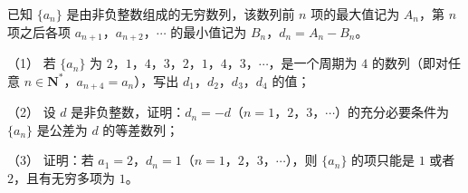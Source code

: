 \begin{question}
已知 $\{a_n\}$ 是由非负整数组成的无穷数列，该数列前 $n$ 项的最大值记为 $A_n$，第 $n$ 项之后各项 $a_{n+1}$，$a_{n+2}$，$\cdots$ 的最小值记为 $B_n$，$d_n=A_n-B_n$。

（1） 若 $\{a_n\}$ 为 $2$，$1$，$4$，$3$，$2$，$1$，$4$，$3$，$\cdots$，是一个周期为 $4$ 的数列（即对任意 $n\in\mathbf N^*$，$a_{n+4}=a_n$），写出 $d_1$，$d_2$，$d_3$，$d_4$ 的值；

（2） 设 $d$ 是非负整数，证明：$d_n=-d$（$n=1$，$2$，$3$，$\cdots$）的充分必要条件为 $\{a_n\}$ 是公差为 $d$ 的等差数列；

（3） 证明：若 $a_1=2$，$d_n=1$（$n=1$，$2$，$3$，$\cdots$），则 $\{a_n\}$ 的项只能是 $1$ 或者 $2$，且有无穷多项为 $1$。

\end{question}
